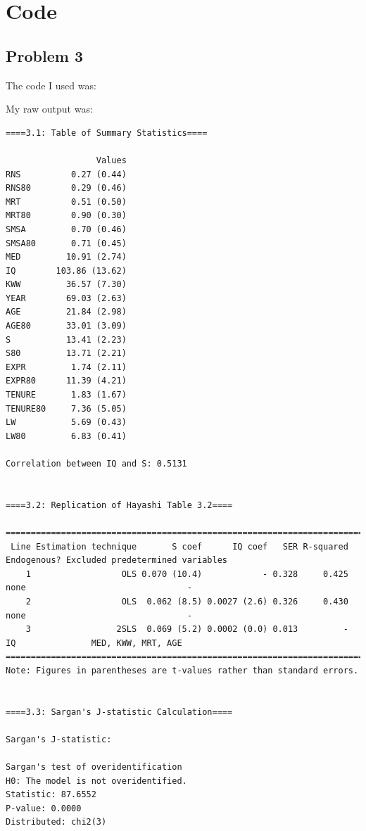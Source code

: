 \documentclass[10pt]{article}
\begin{document}
\begin{enumerate}
\end{enumerate}

    
\newpage
\section*{Code}

\subsection*{Problem 3}\label{code:p3}

The code I used was:



My raw output was:
\begin{verbatim}
====3.1: Table of Summary Statistics====

                  Values
RNS          0.27 (0.44)
RNS80        0.29 (0.46)
MRT          0.51 (0.50)
MRT80        0.90 (0.30)
SMSA         0.70 (0.46)
SMSA80       0.71 (0.45)
MED         10.91 (2.74)
IQ        103.86 (13.62)
KWW         36.57 (7.30)
YEAR        69.03 (2.63)
AGE         21.84 (2.98)
AGE80       33.01 (3.09)
S           13.41 (2.23)
S80         13.71 (2.21)
EXPR         1.74 (2.11)
EXPR80      11.39 (4.21)
TENURE       1.83 (1.67)
TENURE80     7.36 (5.05)
LW           5.69 (0.43)
LW80         6.83 (0.41)

Correlation between IQ and S: 0.5131


====3.2: Replication of Hayashi Table 3.2====

================================================================================
 Line Estimation technique       S coef      IQ coef   SER R-squared Endogenous? Excluded predetermined variables
    1                  OLS 0.070 (10.4)            - 0.328     0.425        none                                -
    2                  OLS  0.062 (8.5) 0.0027 (2.6) 0.326     0.430        none                                -
    3                 2SLS  0.069 (5.2) 0.0002 (0.0) 0.013         -          IQ               MED, KWW, MRT, AGE
================================================================================
Note: Figures in parentheses are t-values rather than standard errors.


====3.3: Sargan's J-statistic Calculation====

Sargan's J-statistic:

Sargan's test of overidentification
H0: The model is not overidentified.
Statistic: 87.6552
P-value: 0.0000
Distributed: chi2(3)



\end{verbatim}
\end{document}
